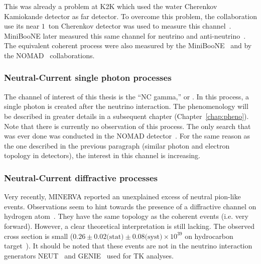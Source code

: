 This was already a problem at \Gls{K2K} which used the water Cherenkov
Kamiokande detector as far detector. To overcome this problem, the
collaboration use its near $1$~ton Cherenkov detector was used to
measure this channel~\cite{Nakayama:2004dp}. \Gls{MiniBooNE} later
measured this same channel for neutrino and
anti-neutrino~\cite{AguilarArevalo:2009ww}. The equivalent coherent
process were also measured by the
\Gls{MiniBooNE}~\cite{AguilarArevalo:2008xs} and by the
\Gls{NOMAD}~\cite{KULLENBERG2009177} collaborations.

\subsubsection{Neutral-Current single photon processes}
\label{subsubsec:ncgprocesses}
The channel of interest of this thesis is the ``\Gls{NC} gamma,'' or
\nisp. In this process, a single photon is created after the neutrino
interaction. The phenomenology will be described in greater details in
a subsequent chapter (Chapter~\ref{chap:pheno}). Note that there is
currently no observation of this process. The only search that was
ever done was conducted in the \Gls{NOMAD}
detector~\cite{NOMADncg}. For the same reason as the one described in
the previous paragraph (similar photon and electron topology in
detectors), the interest in this channel is increasing.

\subsubsection{Neutral-Current diffractive processes}
Very recently, \Gls{MINERVA} reported an unexplained excess of neutral
pion-like events. Observations seem to hint towards the presence of a
diffractive channel on hydrogen atom~\cite{Wolcott:2016hws}. They have
the same topology as the coherent events (i.e. very forward). However,
a clear theoretical interpretation is still lacking. The observed
cross section is small
($0.26\pm0.02\text{(stat)}\pm0.08\text{(syst)}\times10^{39}$ on
hydrocarbon target~\cite{Wolcott:2016hws}). It should be noted that
these events are not in the neutrino interaction generators
\Gls{NEUT}~\cite{NEUT} and \Gls{GENIE}~\cite{GENIE1,GENIE2} used for
\Gls{TK} analyses.










